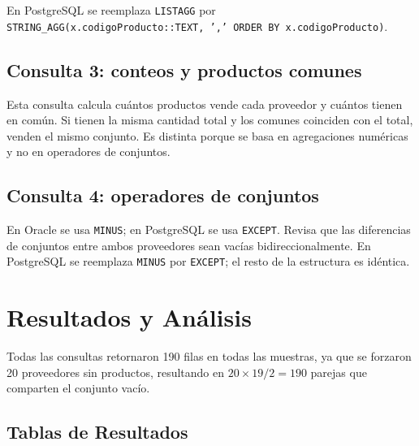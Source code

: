 \documentclass[12pt,a4paper]{article}
\begin{document}
En PostgreSQL se reemplaza \texttt{LISTAGG} por \texttt{STRING\_AGG(x.codigoProducto::TEXT, ',' ORDER BY x.codigoProducto)}.

\subsection{Consulta 3: conteos y productos comunes}
Esta consulta calcula cuántos productos vende cada proveedor y cuántos tienen en común. Si tienen la misma cantidad total y los comunes coinciden con el total, venden el mismo conjunto. Es distinta porque se basa en agregaciones numéricas y no en operadores de conjuntos.

\subsection{Consulta 4: operadores de conjuntos}
En Oracle se usa \texttt{MINUS}; en PostgreSQL se usa \texttt{EXCEPT}. Revisa que las diferencias de conjuntos entre ambos proveedores sean vacías bidireccionalmente. En PostgreSQL se reemplaza \texttt{MINUS} por \texttt{EXCEPT}; el resto de la estructura es idéntica.

\section{Resultados y Análisis}
Todas las consultas retornaron 190 filas en todas las muestras, ya que se forzaron 20 proveedores sin productos, resultando en $20 \times 19 / 2 = 190$ parejas que comparten el conjunto vacío.

\subsection{Tablas de Resultados}
\end{document}
